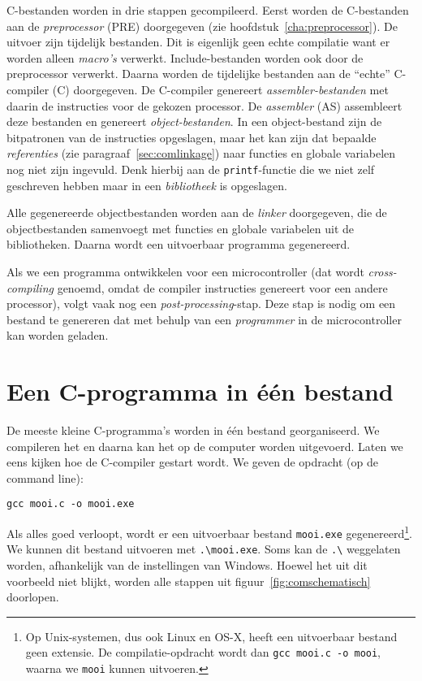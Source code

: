 C-bestanden worden in drie stappen gecompileerd. Eerst worden de C-bestanden aan de \textsl{preprocessor} (PRE) doorgegeven (zie hoofdstuk~\ref{cha:preprocessor}). De uitvoer zijn tijdelijk bestanden. Dit is eigenlijk geen echte compilatie want er worden alleen \textsl{macro's} verwerkt. Include-bestanden worden ook door de preprocessor verwerkt. Daarna worden de tijdelijke bestanden aan de ``echte'' C-compiler (C) doorgegeven. De C-compiler genereert \textsl{assembler-bestanden} met daarin de instructies voor de gekozen processor. De \textsl{assembler} (AS) assembleert deze bestanden en genereert \textsl{object-bestanden}. In een object-bestand zijn de bitpatronen van de instructies opgeslagen, maar het kan zijn dat bepaalde \textsl{referenties} (zie paragraaf~\ref{sec:comlinkage}) naar functies en globale variabelen nog niet zijn ingevuld. Denk hierbij aan de \texttt{printf}-functie die we niet zelf geschreven hebben maar in een \textsl{bibliotheek} is opgeslagen. %

Alle gegenereerde objectbestanden worden aan de \textsl{linker} doorgegeven, die de objectbestanden samenvoegt met functies en globale variabelen uit de bibliotheken. Daarna wordt een uitvoerbaar programma gegenereerd.

Als we een programma ontwikkelen voor een microcontroller (dat wordt \textsl{cross-compiling} genoemd, omdat de compiler instructies genereert voor een andere processor), volgt vaak nog een \textsl{post-processing}-stap. Deze stap is nodig om een bestand te genereren dat met behulp van een \textsl{programmer} in de microcontroller kan worden geladen.


\section{Een C-programma in één bestand}
De meeste kleine C-programma's worden in één bestand georganiseerd. We compileren het en daarna kan het op de computer worden uitgevoerd. Laten we eens kijken hoe de C-compiler gestart wordt. We geven de opdracht (op de command line):

\begin{lstlisting}[style=lstoneline]
gcc mooi.c -o mooi.exe
\end{lstlisting}

Als alles goed verloopt, wordt er een uitvoerbaar bestand \texttt{mooi.exe} gegenereerd\footnote{Op Unix-systemen, dus ook Linux en OS-X, heeft een uitvoerbaar bestand geen extensie. De compilatie-opdracht wordt dan \texttt{gcc mooi.c -o mooi}, waarna we \texttt{mooi} kunnen uitvoeren.}. We kunnen dit bestand uitvoeren met \texttt{.\textbackslash mooi.exe}. Soms kan de \texttt{.\textbackslash} weggelaten worden, afhankelijk van de instellingen van Windows.
Hoewel het uit dit voorbeeld niet blijkt, worden alle stappen uit figuur~\ref{fig:comschematisch} doorlopen.


